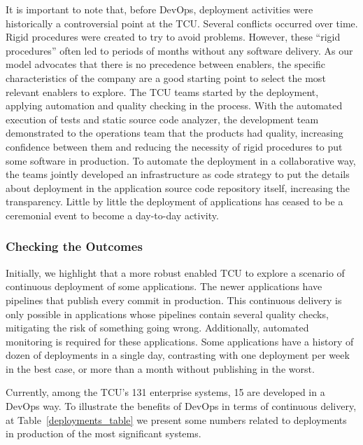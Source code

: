 It is important to note that, before DevOps, deployment activities were
historically a controversial point at the TCU. Several conflicts occurred over
time. Rigid procedures were created to try to avoid problems. However, these ``rigid
procedures'' often led to periods of months without any software delivery. As
our model advocates that there is no precedence between enablers, the specific
characteristics of the company are a good starting point to select the most
relevant enablers to explore. The TCU teams started by the deployment,
applying automation and quality checking in the process. With the automated
execution of tests and static source code analyzer, the development team
demonstrated to the operations team that the products had quality, increasing
confidence between them and reducing the necessity of rigid procedures to put
some software in production. To automate the deployment in a collaborative
way, the teams jointly developed an infrastructure as code strategy to put the
details about deployment in the application source code repository itself,
increasing the transparency. Little by little the deployment of applications has
ceased to be a ceremonial event to become a day-to-day activity.

\subsubsection{Checking the Outcomes}

Initially, we highlight that a more robust \cc enabled TCU to explore a scenario
of continuous deployment of some applications. The newer applications have
pipelines that publish every commit in production. This continuous delivery is
only possible in applications whose pipelines contain several quality checks,
mitigating the risk of something going wrong. Additionally, automated monitoring
is required for these applications. Some applications have a history of dozen
of deployments in a single day, contrasting with one deployment per week in the
best case, or more than a month without publishing in the worst.


Currently, among the TCU's 131 enterprise systems, 15 are developed in a DevOps way.
To illustrate the benefits of DevOps in terms of continuous delivery, at Table~\ref{deployments_table}
we present some numbers related to deployments
in production of the most significant systems.

